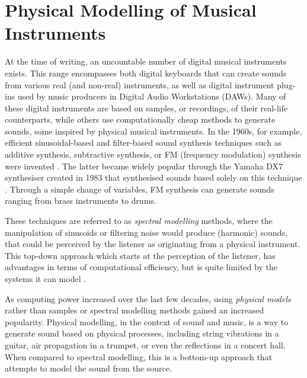 \chapter{Physical Modelling of Musical Instruments}\label{ch:physMod}
At the time of writing, an uncountable number of digital musical instruments exists. This range encompasses both digital keyboards that can create sounds from various real (and non-real) instruments, as well as digital instrument plug-ins used by music producers in Digital Audio Workstations (DAWs). Many of these digital instruments are based on samples, or recordings, of their real-life counterparts, while others use computationally cheap methods to generate sounds, some inspired by physical musical instruments. In the 1960s, for example, efficient sinusoidal-based and filter-based sound synthesis techniques such as additive synthesis, subtractive synthesis, or FM (frequency modulation) synthesis  were invented \cite{Roads1996, Chowning1973}. The latter became widely popular through the Yamaha DX7 synthesiser created in 1983 that synthesised sounds based solely on this technique \cite{DX7}. Through a simple change of variables, FM synthesis can generate sounds ranging from brass instruments to drums. 

These techniques are referred to as \textit{spectral modelling} methods, where the manipulation of sinusoids or filtering noise would produce (harmonic) sounds, that could be perceived by the listener as originating from a physical instrument. This top-down approach which starts at the perception of the listener, has advantages in terms of computational efficiency, but is quite limited by the systems it can model \cite{Smith2010a}. 

As computing power increased over the last few decades, using \textit{physical models} rather than samples or spectral modelling methods gained an increased popularity.
Physical modelling, in the context of sound and music, is a way to generate sound based on physical processes, including string vibrations in a guitar, air propagation in a trumpet, or even the reflections in a concert hall. When compared to spectral modelling, this is a bottom-up approach that attempts to model the sound from the source.  


